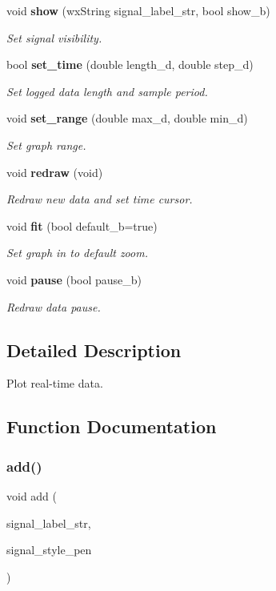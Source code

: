 \begin{DoxyCompactItemize}
void \textbf{ show} (wx\+String signal\+\_\+label\+\_\+str, bool show\+\_\+b)
\begin{DoxyCompactList}\small\item\em Set signal visibility. \end{DoxyCompactList}\item 
bool \textbf{ set\+\_\+time} (double length\+\_\+d, double step\+\_\+d)
\begin{DoxyCompactList}\small\item\em Set logged data length and sample period. \end{DoxyCompactList}\item 
void \textbf{ set\+\_\+range} (double max\+\_\+d, double min\+\_\+d)
\begin{DoxyCompactList}\small\item\em Set graph range. \end{DoxyCompactList}\item 
void \textbf{ redraw} (void)
\begin{DoxyCompactList}\small\item\em Redraw new data and set time cursor. \end{DoxyCompactList}\item 
void \textbf{ fit} (bool default\+\_\+b=true)
\begin{DoxyCompactList}\small\item\em Set graph in to default zoom. \end{DoxyCompactList}\item 
void \textbf{ pause} (bool pause\+\_\+b)
\begin{DoxyCompactList}\small\item\em Redraw data pause. \end{DoxyCompactList}\end{DoxyCompactItemize}


\subsection{Detailed Description}
Plot real-\/time data. 



\subsection{Function Documentation}
\mbox{\label{group__data__plot_ga3f49e53d9701a6e2701b9ab0a30db44a}} 
\subsubsection{add()}
{\footnotesize\ttfamily void add (\begin{DoxyParamCaption}\item[{wx\+String}]{signal\+\_\+label\+\_\+str,  }\item[{wx\+Pen}]{signal\+\_\+style\+\_\+pen }\end{DoxyParamCaption})}



